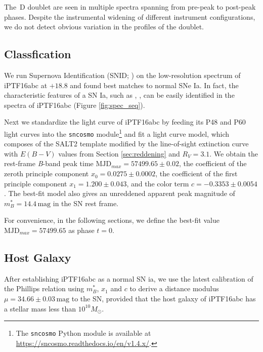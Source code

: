 \documentclass[twocolumn]{aastex61}
\newcommand{\sm}{M_\odot}
\begin{document}
The \,D doublet are seen in multiple spectra spanning
from pre-peak to post-peak phases. Despite the instrumental widening of
different instrument configurations, we do not detect obvious variation
in the profiles of the doublet.


\subsection{Classfication}
\label{sec:classification}

We run Supernova Identification (SNID; \citealt{2007ApJ...666.1024B})
on the low-resolution spectrum of iPTF16abc at $+18.8$ and found best
matches to normal SNe Ia. In fact, the characteristic features of a SN
Ia, such as , , can be easily identified in the
spectra of iPTF16abc (Figure \ref{fig:spec_seq}).

Next we standardize the light curve of iPTF16abc by feeding its P48
and P60 light curves into the \texttt{sncosmo} module\footnote{The
  \texttt{sncosmo} Python module is available at
  \url{https://sncosmo.readthedocs.io/en/v1.4.x/}.} and fit a light
curve model, which composes of the SALT2 template
\citep{2007A&A...466...11G} modified by the line-of-sight extinction
curve \citep{1999PASP..111...63F} with $E(B-V)$ values from Section
\ref{sec:reddening} and $R_V=3.1$. We obtain the rest-frame
\textit{B}-band peak time $\textrm{MJD}_{max}=57499.65\pm0.02$, the coefficient
of the zeroth principle component $x_0=0.0275\pm0.0002$, the
coefficient of the first principle component $x_1=1.200\pm0.043$, and
the color term $c=-0.3353\pm0.0054$. The best-fit model also gives an
unreddened apparent peak magnitude of $m^*_{B}=14.4\,\textrm{mag}$ in
the SN rest frame.

For convenience, in the following sections, we define the best-fit
value $\textrm{MJD}_{max}=57499.65$ as phase $t=0$.

\subsection{Host Galaxy}
\label{sec:host}

After establishing iPTF16abc as a normal SN ia, we use the latest
calibration \citep{2014A&A...568A..22B} of the Phillips relation
\citep{1993ApJ...413L.105P} using $m^*_{B}$, $x_1$ and $c$ to derive a
distance modulus $\mu=34.66\pm0.03\,\textrm{mag}$ to the SN, provided
that the host galaxy of iPTF16abc has a stellar mass less than
$10^{10}\sm$.
\end{document}
